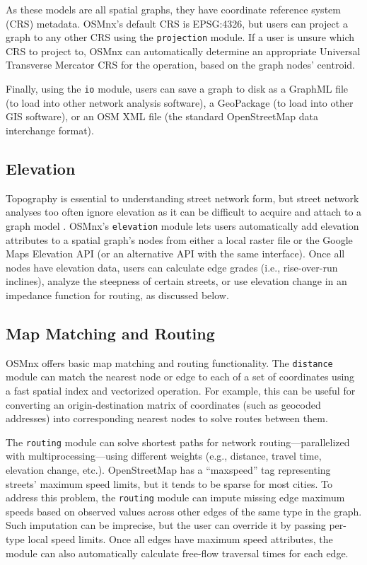 \documentclass[12pt,letterpaper]{article} %
\begin{document}
As these models are all spatial graphs, they have coordinate reference system (CRS) metadata. OSMnx's default CRS is EPSG:4326, but users can project a graph to any other CRS using the \texttt{projection} module. If a user is unsure which CRS to project to, OSMnx can automatically determine an appropriate Universal Transverse Mercator CRS for the operation, based on the graph nodes' centroid.

Finally, using the \texttt{io} module, users can save a graph to disk as a GraphML file (to load into other network analysis software), a GeoPackage (to load into other GIS software), or an OSM XML file (the standard OpenStreetMap data interchange format).

\subsection{Elevation}

Topography is essential to understanding street network form, but street network analyses too often ignore elevation as it can be difficult to acquire and attach to a graph model \citep{boeing_street_2021}. OSMnx's \texttt{elevation} module lets users automatically add elevation attributes to a spatial graph's nodes from either a local raster file or the Google Maps Elevation API (or an alternative API with the same interface). Once all nodes have elevation data, users can calculate edge grades (i.e., rise-over-run inclines), analyze the steepness of certain streets, or use elevation change in an impedance function for routing, as discussed below.

\subsection{Map Matching and Routing}

OSMnx offers basic map matching and routing functionality. The \texttt{distance} module can match the nearest node or edge to each of a set of coordinates using a fast spatial index and vectorized operation. For example, this can be useful for converting an origin-destination matrix of coordinates (such as geocoded addresses) into corresponding nearest nodes to solve routes between them.

The \texttt{routing} module can solve shortest paths for network routing---parallelized with multiprocessing---using different weights (e.g., distance, travel time, elevation change, etc.). OpenStreetMap has a \enquote{maxspeed} tag representing streets' maximum speed limits, but it tends to be sparse for most cities. To address this problem, the \texttt{routing} module can impute missing edge maximum speeds based on observed values across other edges of the same type in the graph. Such imputation can be imprecise, but the user can override it by passing per-type local speed limits. Once all edges have maximum speed attributes, the module can also automatically calculate free-flow traversal times for each edge.
\end{document}
